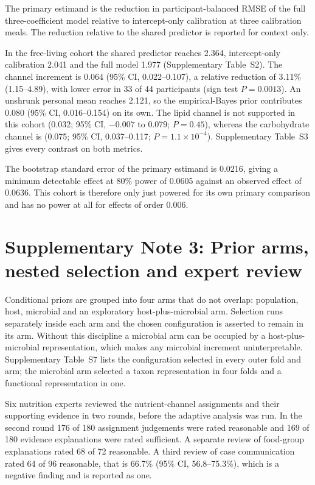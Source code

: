 \documentclass[10pt]{article}
\begin{document}
The primary estimand is the reduction in participant-balanced RMSE of the full three-coefficient
model relative to intercept-only calibration at three calibration meals. The reduction relative to
the shared predictor is reported for context only.

In the free-living cohort the shared predictor reaches 2.364, intercept-only calibration 2.041 and
the full model 1.977 (Supplementary Table~S2). The channel increment is 0.064
(95\% CI, 0.022--0.107), a relative reduction of 3.11\% (1.15--4.89), with lower error in 33 of 44
participants (sign test $P=0.0013$). An unshrunk personal mean reaches 2.121, so the
empirical-Bayes prior contributes 0.080 (95\% CI, 0.016--0.154) on its own. The lipid channel is
not supported in this cohort (0.032; 95\% CI, $-0.007$ to 0.079; $P=0.45$), whereas the
carbohydrate channel is (0.075; 95\% CI, 0.037--0.117; $P=1.1\times10^{-4}$). Supplementary
Table~S3 gives every contrast on both metrics.

The bootstrap standard error of the primary estimand is 0.0216, giving a minimum detectable effect
at 80\% power of 0.0605 against an observed effect of 0.0636. This cohort is therefore only just
powered for its own primary comparison and has no power at all for effects of order 0.006.



\clearpage

\section*{Supplementary Note 3: Prior arms, nested selection and expert review}

Conditional priors are grouped into four arms that do not overlap: population, host, microbial and
an exploratory host-plus-microbial arm. Selection runs separately inside each arm and the chosen
configuration is asserted to remain in its arm. Without this discipline a microbial arm can be
occupied by a host-plus-microbial representation, which makes any microbial increment
uninterpretable. Supplementary Table~S7 lists the configuration selected in every outer fold and
arm; the microbial arm selected a taxon representation in four folds and a functional
representation in one.

Six nutrition experts reviewed the nutrient-channel assignments and their supporting evidence in
two rounds, before the adaptive analysis was run. In the second round 176 of 180 assignment
judgements were rated reasonable and 169 of 180 evidence explanations were rated sufficient. A
separate review of food-group explanations rated 68 of 72 reasonable. A third review of case
communication rated 64 of 96 reasonable, that is 66.7\% (95\% CI, 56.8--75.3\%), which is a
negative finding and is reported as one.
\end{document}
